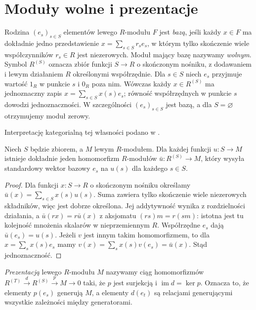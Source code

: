 \section{Moduły wolne i prezentacje}
\begin{definicja}
\label{aa:def:modules-free}
Rodzina $(e_s)_{s\in S}$ elementów lewego $R$-modułu
$F$ jest \emph{bazą}, jeśli każdy $x\in F$ ma dokładnie
jedno przedstawienie $x=\sum_{s\in S}r_se_s$,
w którym tylko skończenie wiele współczynników
$r_s\in R$ jest niezerowych. Moduł mający bazę
nazywamy \emph{wolnym}. Symbol $R^{(S)}$ oznacza
zbiór funkcji $S\to R$ o skończonym nośniku,
z dodawaniem i lewym działaniem $R$ określonymi
współrzędnie. Dla $s\in S$ niech $e_s$ przyjmuje
wartość $1_R$ w punkcie $s$ i $0_R$ poza nim.
Wówczas każdy $x\in R^{(S)}$ ma jednoznaczny zapis
$x=\sum_{s\in S}x(s)e_s$; równość współrzędnych
w punkcie $s$ dowodzi jednoznaczności. W szczególności
$(e_s)_{s\in S}$ jest bazą, a dla $S=\varnothing$
otrzymujemy moduł zerowy.
\end{definicja}

Interpretację kategorialną tej własności podano w .

\begin{twierdzenie}
\label{aa:tw:modules-free-universal}
Niech $S$ będzie zbiorem, a $M$ lewym $R$-modułem.
Dla każdej funkcji $u:S\to M$ istnieje dokładnie
jeden homomorfizm $R$-modułów
$\bar u:R^{(S)}\to M$, który wysyła standardowy
wektor bazowy $e_s$ na $u(s)$ dla każdego $s\in S$.
\end{twierdzenie}
\begin{proof}
Dla funkcji $x:S\to R$ o skończonym nośniku
określamy $\bar u(x)=\sum_{s\in S}x(s)u(s)$.
Suma zawiera tylko skończenie wiele niezerowych
składników, więc jest dobrze określona.
Jej addytywność wynika z rozdzielności działania,
a $\bar u(rx)=r\bar u(x)$ z aksjomatu
$(rs)m=r(sm)$: istotna jest tu kolejność
mnożenia skalarów w nieprzemiennym $R$.
Współrzędne $e_s$ dają $\bar u(e_s)=u(s)$.
Jeżeli $v$ jest innym takim homomorfizmem,
to dla $x=\sum_s x(s)e_s$ mamy
$v(x)=\sum_s x(s)v(e_s)=\bar u(x)$.
Stąd jednoznaczność.
\end{proof}

\begin{definicja}
\label{aa:def:modules-presentation}
\emph{Prezentacją} lewego $R$-modułu $M$ nazywamy
ciąg homomorfizmów
$R^{(T)}\xrightarrow{d}R^{(S)}\xrightarrow{p}M\to0$
taki, że $p$ jest surjekcją i $\operatorname{im}d=\ker p$.
Oznacza to, że elementy $p(e_s)$ generują $M$,
a elementy $d(e_t)$ są relacjami generującymi
wszystkie zależności między generatorami.
\end{definicja}

